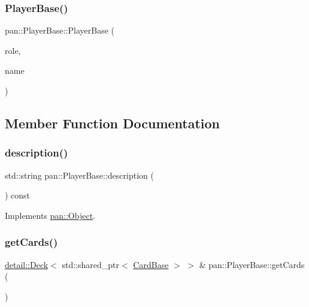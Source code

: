 \subsubsection{\texorpdfstring{Player\+Base()}{PlayerBase()}\hspace{0.1cm}{\footnotesize\ttfamily [2/2]}}
{\footnotesize\ttfamily pan\+::\+Player\+Base\+::\+Player\+Base (\begin{DoxyParamCaption}\item[{const \hyperlink{classpan_1_1_role_base}{Role\+Base} \&}]{role,  }\item[{const std\+::string \&}]{name }\end{DoxyParamCaption})\hspace{0.3cm}{\ttfamily [protected]}}



\subsection{Member Function Documentation}
\mbox{\label{classpan_1_1_player_base_a9b3e10457a0d749d97d91b6461882ac6}} 
\subsubsection{\texorpdfstring{description()}{description()}}
{\footnotesize\ttfamily std\+::string pan\+::\+Player\+Base\+::description (\begin{DoxyParamCaption}{ }\end{DoxyParamCaption}) const\hspace{0.3cm}{\ttfamily [virtual]}}



Implements \hyperlink{classpan_1_1_object_a2bb6d3117bb32f5774657c83f118ed8b}{pan\+::\+Object}.

\mbox{\label{classpan_1_1_player_base_ada4d9050732037e7436cb78244ec177b}} 
\subsubsection{\texorpdfstring{get\+Cards()}{getCards()}\hspace{0.1cm}{\footnotesize\ttfamily [1/2]}}
{\footnotesize\ttfamily \hyperlink{classpan_1_1detail_1_1_deck}{detail\+::\+Deck}$<$ std\+::shared\+\_\+ptr$<$ \hyperlink{classpan_1_1_card_base}{Card\+Base} $>$ $>$ \& pan\+::\+Player\+Base\+::get\+Cards (\begin{DoxyParamCaption}{ }\end{DoxyParamCaption})\hspace{0.3cm}{\ttfamily [inline]}}

